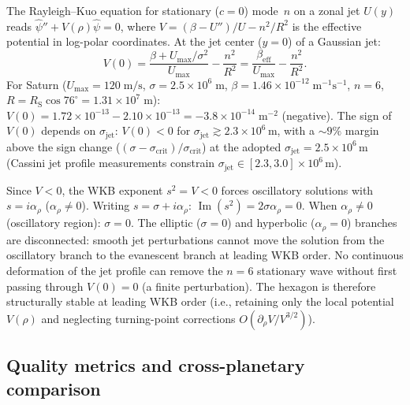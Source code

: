 The Rayleigh--Kuo equation for stationary ($c = 0$) mode~$n$ on a
zonal jet $U(y)$ reads $\hat\psi'' + V(\rho)\hat\psi = 0$, where
$V = (\beta - U'')/U - n^2/R^2$ is the effective potential in
log-polar coordinates.  At the jet center ($y = 0$) of a Gaussian jet:
\[
  V(0) = \frac{\beta + U_{\max}/\sigma^2}{U_{\max}} - \frac{n^2}{R^2}
  = \frac{\beta_{\mathrm{eff}}}{U_{\max}} - \frac{n^2}{R^2}.
\]
For Saturn ($U_{\max} = 120\;\mathrm{m/s}$, $\sigma = 2.5\times
10^6\;\mathrm{m}$, $\beta = 1.46\times 10^{-12}\;\mathrm{m^{-1}
s^{-1}}$, $n = 6$, $R = R_{\mathrm{S}}\cos 76^\circ = 1.31\times
10^7\;\mathrm{m}$):
$V(0) = 1.72\times 10^{-13} - 2.10\times 10^{-13} =
-3.8\times 10^{-14}\;\mathrm{m}^{-2}$ (negative).
The sign of $V(0)$ depends on $\sigma_{\mathrm{jet}}$:
$V(0) < 0$ for $\sigma_{\mathrm{jet}} \gtrsim 2.3 \times 10^6$\,m,
with a $\sim\!9\%$ margin above the sign change
($(\sigma - \sigma_{\mathrm{crit}})/\sigma_{\mathrm{crit}}$)
at the adopted
$\sigma_{\mathrm{jet}} = 2.5 \times 10^6$\,m (Cassini jet profile
measurements constrain $\sigma_{\mathrm{jet}} \in [2.3, 3.0]
\times 10^6$\,m).

Since $V < 0$, the WKB exponent $s^2 = V < 0$ forces oscillatory
solutions with $s = i\alpha_\rho$ ($\alpha_\rho \ne 0$).  Writing
$s = \sigma + i\alpha_\rho$:
$\operatorname{Im}(s^2) = 2\sigma\alpha_\rho = 0$.
When $\alpha_\rho \ne 0$ (oscillatory region): $\sigma = 0$.
The elliptic ($\sigma = 0$) and hyperbolic ($\alpha_\rho = 0$)
branches are disconnected: smooth jet perturbations cannot move the
solution from the oscillatory branch to the evanescent branch at
leading WKB order.  No continuous deformation of the jet profile
can remove the $n = 6$ stationary wave without first passing through
$V(0) = 0$ (a finite perturbation).  The hexagon is therefore
structurally stable at leading WKB order (i.e., retaining only the
local potential $V(\rho)$ and neglecting turning-point corrections
$O(\partial_\rho V / V^{3/2})$).

\subsection{Quality metrics and cross-planetary comparison}
\label{sec:quality-metrics}


